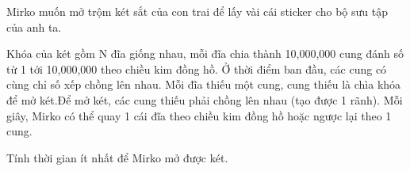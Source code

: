 Mirko muốn mở trộm két sắt của con trai để lấy vài cái sticker cho  bộ sưu tập của anh ta.  

   Khóa của két gồm N đĩa giống nhau, mỗi đĩa chia thành 10,000,000 cung đánh số từ 1 tới 10,000,000 theo chiều kim đồng hồ. Ở thời điểm ban  đầu, các cung có cùng chỉ số xếp chồng lên nhau. Mỗi đĩa thiếu một cung, cung thiếu là chìa khóa để mở két.Để mở két, các cung thiếu phải chồng lên nhau (tạo được 1 rãnh). Mỗi giây, Mirko có thể quay 1 cái đĩa theo chiều kim đồng hồ hoặc ngược lại theo 1 cung.  

   Tính thời gian ít nhất để Mirko mở được két.  

\